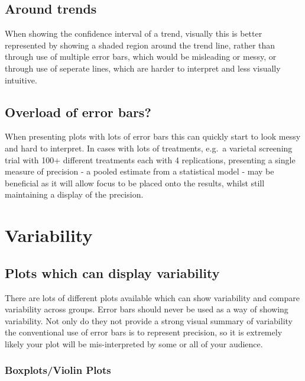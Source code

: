\documentclass[
]{book}
\begin{document}
\hypertarget{around-trends}{%
\subsection{Around trends}\label{around-trends}}

When showing the confidence interval of a trend, visually this is better represented by showing a shaded region around the trend line, rather than through use of multiple error bars, which would be misleading or messy, or through use of seperate lines, which are harder to interpret and less visually intuitive.

\hypertarget{overload-of-error-bars}{%
\subsection{Overload of error bars?}\label{overload-of-error-bars}}

When presenting plots with lots of error bars this can quickly start to look messy and hard to interpret. In cases with lots of treatments, e.g.~a varietal screening trial with 100+ different treatments each with 4 replications, presenting a single measure of precision - a pooled estimate from a statistical model - may be beneficial as it will allow focus to be placed onto the results, whilst still maintaining a display of the precision.

\hypertarget{variability}{%
\section{Variability}\label{variability}}

\hypertarget{plots-which-can-display-variability}{%
\subsection{Plots which can display variability}\label{plots-which-can-display-variability}}

There are lots of different plots available which can show variability and compare variability across groups. Error bars should never be used as a way of showing variability. Not only do they not provide a strong visual summary of variability the conventional use of error bars is to represent precision, so it is extremely likely your plot will be mis-interpreted by some or all of your audience.

\hypertarget{boxplotsviolin-plots}{%
\subsubsection{Boxplots/Violin Plots}\label{boxplotsviolin-plots}}
\end{document}
